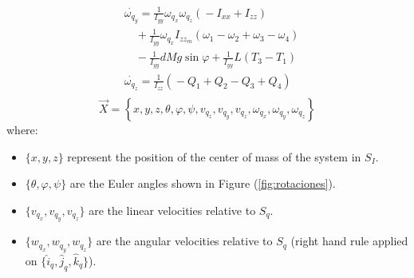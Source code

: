 \documentclass[conference]{IEEEtran}
\newcommand{\refp}[1]{(\ref{#1})}
\begin{document}
\begin{equation}
{\begin{aligned}
&\dot{\omega_{q_y}}\!=\!\frac{1}{I_{yy}}\omega_{q_x}\omega_{q_z}(\!-\!I_{xx}\!+\!I_{zz})\\
&\quad\!+\!\frac{1}{I_{yy}}\omega_{q_x}I_{zz_m}(\omega_1\!-\!\omega_2\!+\!\omega_3\!-\!\omega_4)\\
&\quad\!-\!\frac{1}{I_{yy}}dMg\sin\varphi\!+\!\frac{1}{I_{yy}}L(T_3\!-\!T_1)\\
&\dot{\omega_{q_z}}\!=\!\frac{1}{I_{zz}}\left(\!-\!Q_1\!+\!Q_2\!-\!Q_3\!+\!Q_4\right)\\
\end{aligned}}
\label{eq:modelo}
\end{equation}
\begin{equation}
\vec{X}=\left\lbrace  x,y,z, \theta,\varphi,\psi, v_{q_z},v_{q_y},v_{q_z},\omega_{q_x},\omega_{q_y},\omega_{q_z} \right\rbrace
\label{eq:sv}
\end{equation}
where:
\begin{itemize}
\item $\lbrace x,y,z \rbrace$ represent the position of the center of mass of the system in $S_I$.
\item $\lbrace\theta,\varphi,\psi\rbrace$ are the Euler angles shown in Figure \refp{fig:rotaciones}.
\item $\lbrace v_{q_x},v_{q_y},v_{q_z}\rbrace$ are the linear velocities relative to $S_q$.
\item $\lbrace w_{q_x},w_{q_y},w_{q_z}\rbrace$ are the angular velocities relative to $S_q$ (right hand rule applied on $\lbrace \hat{i}_q,\hat{j}_q,\hat{k}_q\rbrace$).
\end{itemize}
\end{document}
